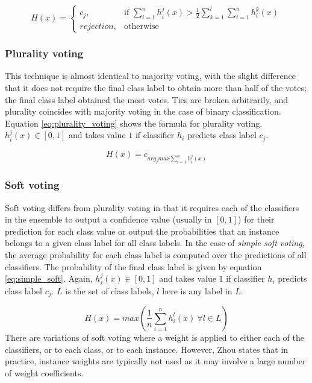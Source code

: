 \begin{equation}
    H(x) = 
\begin{cases}
    c_j,& \text{if } \sum^n_{i=1}h^j_i(x) > \frac{1}{2}\sum_{k=1}^{l}\sum_{i=1}^n h_i^k(x)\\
    rejection,              & \text{otherwise}
\end{cases}
\label{eq:majority_voting}
\end{equation} 

\subsubsection{Plurality voting}
This technique is almost identical to majority voting, with the slight difference that it does not require the final class label to obtain more than half of the votes; the final class label obtained the most votes. Ties are broken arbitrarily, and plurality coincides with majority voting in the case of binary classification. Equation \ref{eq:plurality_voting} shows the formula for plurality voting. $h_i^j(x) \in [0,1]$ and takes value $1$ if classifier $h_i$ predicts class label $c_j$.

\begin{equation}
H(x) = c_{arg_j max\sum^n_{i=1}h^j_i(x)}
\label{eq:plurality_voting}
\end{equation}

\subsubsection{Soft voting}
Soft voting differs from plurality voting in that it requires each of the classifiers in the ensemble to output a confidence value (usually in $[0, 1]$) for their prediction for each class value or output the probabilities that an instance belongs to a given class label for all class labels.
In the case of \textit{simple soft voting}, the average probability for each class label is computed over the predictions of all classifiers. The probability of the final class label is given by equation \ref{eq:simple_soft}. Again, $h_i^j(x) \in [0,1]$ and takes value $1$ if classifier $h_i$ predicts class label $c_j$. $L$ is the set of class labels, $l$ here is any label in $L$.

\begin{equation}
H(x)=max( \frac{1}{n}\sum_{i=1}^nh_i^l(x)\ \forall l \in L)
\label{eq:simple_soft}
\end{equation}
There are variations of soft voting where a weight is applied to either each of the classifiers, or to each class, or to each instance. However, Zhou states that in practice, instance weights are typically not used as it may involve a large number of weight coefficients.

